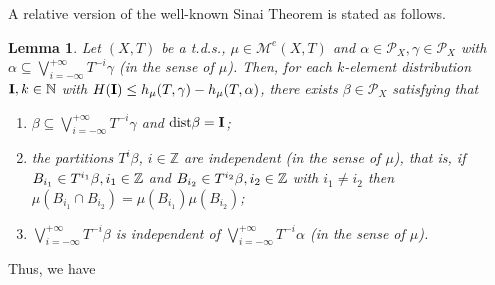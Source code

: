 \documentclass[12pt]{amsart}
\newtheorem{lem}[thm]{Lemma}
\theoremstyle{definition} \theoremstyle{question}
\numberwithin{equation}{section}
\begin{document}
A relative version of the well-known Sinai Theorem is stated as
follows.

\begin{lem} \label{Orn}
Let $(X, T)$ be a t.d.s., $\mu\in \mathcal{M}^e (X ,T)$ and
$\alpha\in \mathcal{P}_X, \gamma\in \mathcal{P}_X$ with
$\alpha\subseteq \bigvee_{i= - \infty}^{+ \infty} T^{- i} \gamma$
(in the sense of $\mu$). Then, for each $k$-element distribution
${\bf I}, k\in {\mathbb N}$ with $H ({\bf I})\le h_\mu (T, \gamma)- h_\mu (T,
\alpha)$,
 there exists $\beta\in \mathcal{P}_X$ satisfying that
\begin{enumerate}

\item $\beta\subseteq
 \bigvee_{i= - \infty}^{+ \infty} T^{- i} \gamma$ and $\text{dist} \beta ={\bf I}$;

\item the partitions $T^i \beta$, $i\in
\mathbb{Z}$ are independent (in the sense of $\mu$), that is, if
$B_{i_1}\in T^{i_1} \beta, i_1\in {\Bbb Z}$ and $B_{i_2}\in T^{i_2} \beta,
i_2\in {\Bbb Z}$ with $i_1\neq i_2$ then $\mu (B_{i_1}\cap B_{i_2})= \mu
(B_{i_1}) \mu (B_{i_2})$;

\item $\bigvee_{i= - \infty}^{+ \infty} T^{- i} \beta$ is independent
of $\bigvee_{i= - \infty}^{+ \infty} T^{- i} \alpha$ (in the sense
of $\mu$).
\end{enumerate}
\end{lem}

Thus, we have
\end{document}
